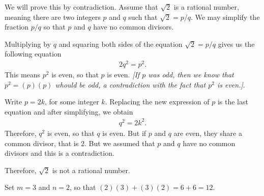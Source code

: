  \begin{problem}
 We will prove this by contradiction. Assume that $\sqrt{2}$ is a rational number, meaning there are two integers $p$ and $q$ such that $\sqrt{2} = p /q$. We may simplify the fraction $p/q$ so that $p$ and $q$ have no common divisors. 

 Multiplying by $q$ and squaring both sides of the equation $\sqrt{2} = p/q$ gives us the following equation
 	\begin{align*}
 	2q^2 = p^2 .
 	\end{align*}
 This means $p^2$ is even, so that $p$ is even. \textit{[If $p$ was odd, then we know that $p^2 = (p)(p)$ whould be odd, a contradiction with the fact that $p^2$ is even.]}.

 Write $p = 2k$, for some integer $k$. Replacing the new expression of $p$ is the last equation and after simplifying, we obtain
 	\begin{align*}
 	q^2 = 2k^2 .
 	\end{align*}
 Therefore, $q^2$ is even, so that $q$ is even. But if $p$ and $q$ are even, they share a common divisor, that is $2$. But we assumed that $p$ and $q$ have no common divisors and this is a contradiction. 

 Therefore, $\sqrt{2}$ is not a rational number.
 \end{problem}

 \begin{problem}
 Set $m = 3$ and $n = 2$, so that $(2)(3) + (3)(2) = 6 + 6 = 12$.
 \end{problem}

